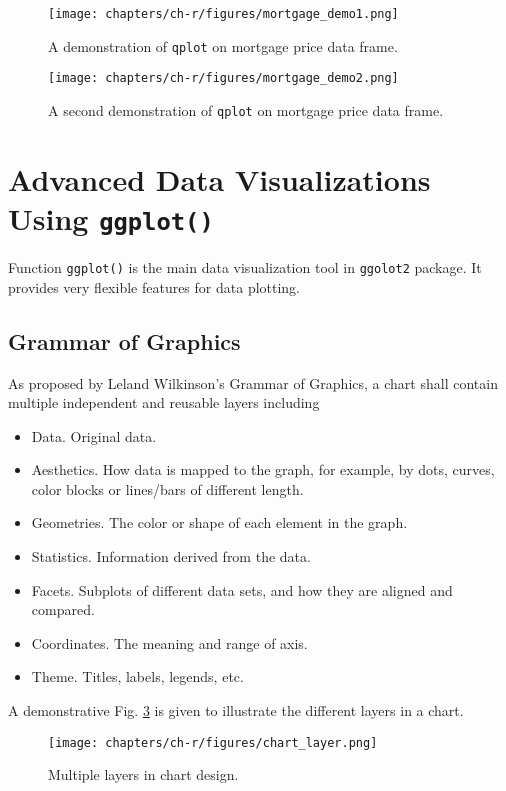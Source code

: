 \begin{figure}
	\centering
	\texttt{[image: chapters/ch-r/figures/mortgage\_demo1.png]}
	\caption{A demonstration of \texttt{qplot} on mortgage price data frame.} \label{ch:r1:fig:mortgage_demo1}
\end{figure}

\begin{figure}
	\centering
	\texttt{[image: chapters/ch-r/figures/mortgage\_demo2.png]}
	\caption{A second demonstration of \texttt{qplot} on mortgage price data frame.} \label{ch:r1:fig:mortgage_demo2}
\end{figure}

\section{Advanced Data Visualizations Using \texttt{ggplot()}} \label{ch:r1:sec:ggplot}

Function \verb|ggplot()| is the main data visualization tool in \verb|ggolot2| package. It provides very flexible features for data plotting.

\subsection{Grammar of Graphics}

As proposed by Leland Wilkinson's Grammar of Graphics, a chart shall contain multiple independent and reusable layers including
\begin{itemize}
  \item Data. Original data.
  \item Aesthetics. How data is mapped to the graph, for example, by dots, curves, color blocks or lines/bars of different length.
  \item Geometries. The color or shape of each element in the graph.
  \item Statistics. Information derived from the data.
  \item Facets. Subplots of different data sets, and how they are aligned and compared.
  \item Coordinates. The meaning and range of axis.
  \item Theme. Titles, labels, legends, etc.
\end{itemize}
A demonstrative Fig. \ref{ch:r1:fig:chart_layer} is given to illustrate the different layers in a chart.

\begin{figure}
	\centering
	\texttt{[image: chapters/ch-r/figures/chart\_layer.png]}
	\caption{Multiple layers in chart design.} \label{ch:r1:fig:chart_layer}
\end{figure}

